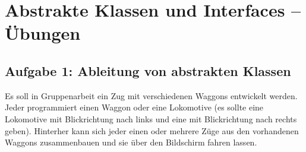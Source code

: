 \clearpage

\rehead[]{\textcolor{lightblue}{AvHG, Inf, My}}
\lohead[]{\textcolor{lightblue}{AvHG, Inf, My}}

\section{Abstrakte Klassen und Interfaces -- Übungen}

\subsection{Aufgabe 1: Ableitung von abstrakten Klassen}

Es soll in Gruppenarbeit ein Zug mit verschiedenen Waggons entwickelt werden.
Jeder programmiert einen Waggon oder eine Lokomotive (es sollte eine Lokomotive
mit Blickrichtung nach links und eine mit Blickrichtung nach rechts geben).
Hinterher kann sich jeder einen oder mehrere Züge aus den vorhandenen Waggons
zusammenbauen und sie über den Bildschirm fahren lassen.

